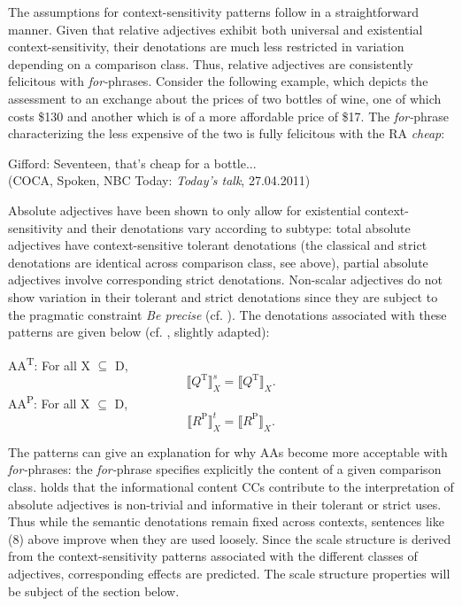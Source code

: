 \documentclass[output=paper
,modfonts
,nonflat]{langsci/langscibook}
\begin{document}
The assumptions for context-sensitivity patterns follow in a straightforward manner. Given that relative adjectives exhibit both universal and existential \linebreak context-sensitivity, their denotations are much less restricted in variation depending on a comparison class. Thus, relative adjectives are consistently felicitous with \textit{for-}phrases. Consider the following example, which depicts the assessment to an exchange about the prices of two bottles of wine, one of which costs \$130 and another which is of a more affordable price of \$17. The  \textit{for-}phrase characterizing the less expensive of the two is fully felicitous with the RA  \textit{cheap}:

\ea
	Gifford: Seventeen, that's cheap for a bottle... \\ (COCA, Spoken, NBC Today: \textit{Today's talk}, 27.04.2011)
\z

Absolute adjectives have been shown to only allow for existential context-sensitivity and their denotations vary according to subtype: total absolute adjectives have context-sensitive tolerant denotations (the classical and strict denotations are identical across comparison class, see above), partial absolute adjectives involve corresponding strict denotations. Non-scalar adjectives do not show variation in their tolerant and strict denotations since they are subject to the pragmatic constraint \textit{Be precise} (cf. \citealt[85]{Burnett2017}). The denotations associated with these patterns are given below (cf. \citealt[85]{Burnett2017}, slightly adapted):

\ea
	AA\textsuperscript{T}: For all X $\subseteq$ D, \[ \llbracket Q^{\text{T}} \rrbracket_X^s = \llbracket Q^{\text{T}}\rrbracket_{X}\text{.}\]
\z
\ea
	AA\textsuperscript{P}: For all X $\subseteq$ D, \[\llbracket R^{\text{P}}\rrbracket_X^t = \llbracket R^{\text{P}}\rrbracket_{X}\text{.}\]
\z

The patterns can give an explanation for why AAs become more acceptable with  \textit{for-}phrases: the \textit{for-}phrase specifies explicitly the content of a given comparison class. \textcite[86]{Burnett2017} holds that the informational content CCs contribute to the interpretation of absolute adjectives is non-trivial and informative in their tolerant or strict uses. Thus while the semantic denotations remain fixed across contexts, sentences like (8) above improve when they are used loosely.
Since the scale structure is derived from the context-sensitivity patterns associated with the different classes of adjectives, corresponding effects are predicted. The scale structure properties will be subject of the section below.
\end{document}
